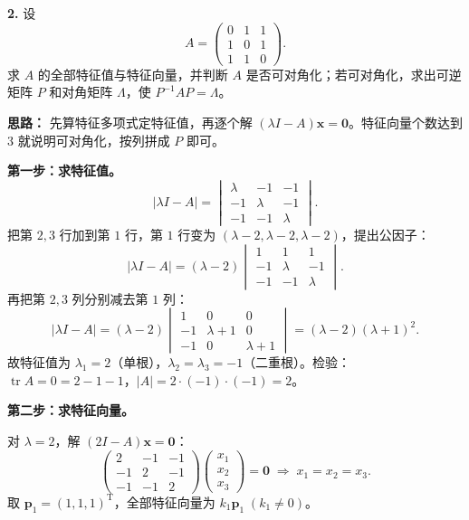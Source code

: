 \else \answerarea[8] \fi%

\textbf{2.} 设
\[
A=\begin{pmatrix}0&1&1\\1&0&1\\1&1&0\end{pmatrix}.
\]
求 \(A\) 的全部特征值与特征向量，并判断 \(A\) 是否可对角化；若可对角化，求出可逆矩阵 \(P\) 和对角矩阵 \(\Lambda\)，使 \(P^{-1}AP=\Lambda\)。

\ifshowsolutions%
\textbf{思路：} 先算特征多项式定特征值，再逐个解 \((\lambda I-A)\mathbf{x}=\mathbf{0}\)。特征向量个数达到 \(3\) 就说明可对角化，按列拼成 \(P\) 即可。

\textbf{第一步：求特征值。}
\[
|\lambda I-A|=
\begin{vmatrix}
\lambda&-1&-1\\
-1&\lambda&-1\\
-1&-1&\lambda
\end{vmatrix}.
\]
把第 \(2,3\) 行加到第 \(1\) 行，第 \(1\) 行变为 \((\lambda-2,\lambda-2,\lambda-2)\)，提出公因子：
\[
|\lambda I-A|=(\lambda-2)
\begin{vmatrix}
1&1&1\\
-1&\lambda&-1\\
-1&-1&\lambda
\end{vmatrix}.
\]
再把第 \(2,3\) 列分别减去第 \(1\) 列：
\[
|\lambda I-A|=(\lambda-2)
\begin{vmatrix}
1&0&0\\
-1&\lambda+1&0\\
-1&0&\lambda+1
\end{vmatrix}
=(\lambda-2)(\lambda+1)^2.
\]
故特征值为 \(\lambda_1=2\)（单根），\(\lambda_2=\lambda_3=-1\)（二重根）。检验：\(\operatorname{tr}A=0=2-1-1\)，\(|A|=2\cdot(-1)\cdot(-1)=2\)。

\textbf{第二步：求特征向量。}

对 \(\lambda=2\)，解 \((2I-A)\mathbf{x}=\mathbf{0}\)：
\[
\begin{pmatrix}
2&-1&-1\\
-1&2&-1\\
-1&-1&2
\end{pmatrix}
\begin{pmatrix}x_1\\x_2\\x_3\end{pmatrix}=\mathbf{0}
\;\Longrightarrow\;
x_1=x_2=x_3.
\]
取 \(\mathbf{p}_1=(1,1,1)^{\mathrm{T}}\)，全部特征向量为 \(k_1\mathbf{p}_1\;(k_1\neq0)\)。

